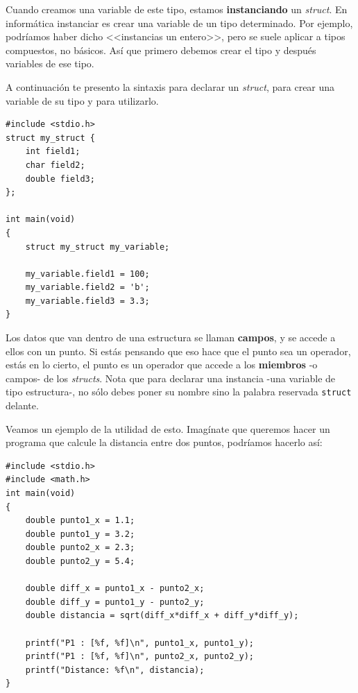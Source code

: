 \documentclass[a4paper]{article}
\begin{document}
Cuando creamos una variable de este tipo, estamos \textbf{instanciando} un
\textit{struct}. En informática instanciar es crear una variable de un tipo
determinado. Por ejemplo, podríamos haber dicho <<instancias un entero>>, pero
se suele aplicar a tipos compuestos, no básicos. Así que primero debemos crear
el tipo y después variables de ese tipo.


A continuación
te presento la sintaxis para declarar un \textit{struct}, para crear una
variable de su tipo y para utilizarlo.


\noindent
\begin{minipage}[H]{\linewidth}
\mbox{}
\begin{lstlisting}[style=C,
caption={Declaración, instanciación y uso de un \textit{struct}},
label={lst:structUse}]
#include <stdio.h>
struct my_struct {
    int field1;
    char field2;
    double field3;
};

int main(void)
{
    struct my_struct my_variable;

    my_variable.field1 = 100;
    my_variable.field2 = 'b';
    my_variable.field3 = 3.3;
}
\end{lstlisting}
\end{minipage}


Los datos que van dentro de una estructura se llaman \textbf{campos}, y
se accede a ellos con un punto. Si estás pensando que eso hace que el punto
sea un operador, estás en lo cierto, el punto es un operador que accede a los
\textbf{miembros} -o campos- de los \textit{structs}. Nota que para declarar
una instancia -una variable de tipo estructura-, no sólo debes poner su nombre
sino la palabra reservada
\lstinline[style=C]{struct} delante.


Veamos un ejemplo de la utilidad de esto. Imagínate que queremos hacer un
programa que calcule la distancia entre dos puntos, podríamos hacerlo así:


\noindent
\begin{minipage}[H]{\linewidth}
\mbox{}
\begin{lstlisting}[style=C,
caption={Ejemplo de resolución de distancia entre puntos},
label={lst:pointNoStruct}]
#include <stdio.h>
#include <math.h>
int main(void)
{
    double punto1_x = 1.1;
    double punto1_y = 3.2;
    double punto2_x = 2.3;
    double punto2_y = 5.4;

    double diff_x = punto1_x - punto2_x;
    double diff_y = punto1_y - punto2_y;
    double distancia = sqrt(diff_x*diff_x + diff_y*diff_y);

    printf("P1 : [%f, %f]\n", punto1_x, punto1_y);
    printf("P1 : [%f, %f]\n", punto2_x, punto2_y);
    printf("Distance: %f\n", distancia);
}
\end{lstlisting}
\end{minipage}
\end{document}
